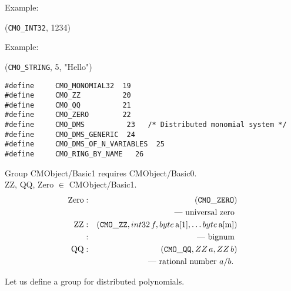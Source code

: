 \noindent
Example:
\begin{center}
({\tt CMO\_INT32}, 1234)
\end{center}
Example:
\begin{center}
({\tt CMO\_STRING}, 5, "Hello")
\end{center}

\begin{verbatim}
#define     CMO_MONOMIAL32  19
#define     CMO_ZZ          20 
#define     CMO_QQ          21
#define     CMO_ZERO        22
#define     CMO_DMS          23   /* Distributed monomial system */
#define     CMO_DMS_GENERIC  24
#define     CMO_DMS_OF_N_VARIABLES  25
#define     CMO_RING_BY_NAME   26
\end{verbatim}
\bigbreak
\noindent
Group CMObject/Basic1 requires CMObject/Basic0. \\
ZZ, QQ, Zero $\in$ CMObject/Basic1. \\
\begin{eqnarray*}
\mbox{Zero} &:& ({\tt CMO\_ZERO}) \\ 
            & & \mbox{ --- universal zero } \\
\mbox{ZZ}         &:& ({\tt CMO\_ZZ},{\sl int32}\, f, {\sl byte}\, \mbox{a[1]}, \ldots
                           {\sl byte}\, \mbox{a[m]} ) \\
                 &:& \mbox{ --- bignum }\\
\mbox{QQ}        &:& ({\tt CMO\_QQ}, {\sl ZZ}\, a, {\sl ZZ}\, b) \\
                 & & \mbox{ --- rational number $a/b$. } \\
\end{eqnarray*}

\bigbreak
Let us define a group for distributed polynomials.

